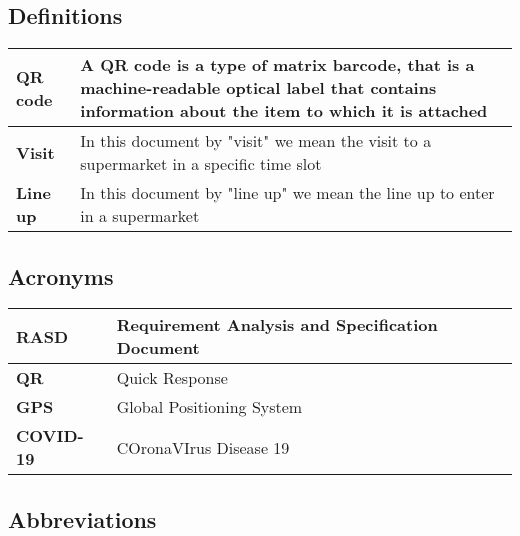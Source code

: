 \subsection{Definitions}

    \begin{center}
        {\renewcommand{\arraystretch}{2.4}%
        \begin{tabular}{L{2cm}L{14cm}}
            \hline
            \textbf{QR code} & A QR code is a type of matrix barcode, that is a machine-readable optical label that 
            contains information about the item to which it is attached \\
            \hline
            \textbf{Visit} & In this document by "visit" we mean the visit to a supermarket in a specific time slot \\
            \hline
            \textbf{Line up} & In this document by "line up" we mean the line up to enter in a supermarket \\
            \hline
        \end{tabular}}
    \end{center}
    

\subsection{Acronyms}

    \begin{center}
        {\renewcommand{\arraystretch}{2.4}%
        \begin{tabular}{L{2cm}L{14cm}}
            \hline
            \textbf{RASD} & Requirement Analysis and Specification Document \\
            \hline
            \textbf{QR} & Quick Response \\
            \hline
            \textbf{GPS} & Global Positioning System \\
            \hline
            \textbf{COVID-19} & COronaVIrus Disease 19 \\
            \hline
        \end{tabular}}
    \end{center}

\subsection{Abbreviations}

